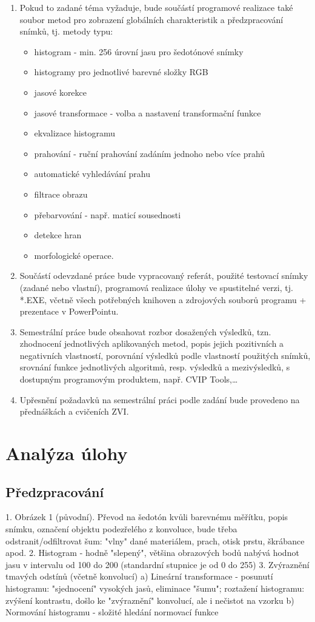 \documentclass[12pt, a4paper]{report}
\begin{document}
\begin{enumerate}
	\item Pokud to zadané téma vyžaduje, bude součástí programové realizace také soubor metod pro
zobrazení globálních charakteristik a předzpracování snímků, tj. metody typu:
	\begin{itemize}
		\item histogram - min. 256 úrovní jasu pro šedotónové snímky
		\item histogramy pro jednotlivé barevné složky RGB
		\item jasové korekce
		\item jasové transformace - volba a nastavení transformační funkce
		\item ekvalizace histogramu
		\item prahování - ruční prahování zadáním jednoho nebo více prahů
		\item automatické vyhledávání prahu
		\item filtrace obrazu
		\item přebarvování - např. maticí sousednosti
		\item detekce hran
		\item morfologické operace.
	\end{itemize}		
\item{Součástí odevzdané práce bude vypracovaný referát, použité testovací snímky (zadané nebo
vlastní), programová realizace úlohy ve spustitelné verzi, tj. *.EXE, včetně všech potřebných
knihoven a zdrojových souborů programu + prezentace v PowerPointu.}
\item{Semestrální práce bude obsahovat rozbor dosažených výsledků, tzn. zhodnocení jednotlivých
aplikovaných metod, popis jejich pozitivních a negativních vlastností, porovnání výsledků podle
vlastností použitých snímků, srovnání funkce jednotlivých algoritmů, resp. výsledků
a mezivýsledků, s dostupným programovým produktem, např. CVIP Tools,…}
\item{Upřesnění požadavků na semestrální práci podle zadání bude provedeno na přednáškách
a cvičeních ZVI.}
\end{enumerate}
\chapter{Analýza úlohy}
	\section{Předzpracování}
	1. Obrázek 1 (původní). Převod na šedotón kvůli barevnému měřítku, popis snímku, označení objektu podezřelého z konvoluce, bude třeba odstranit/odfiltrovat šum: "vlny" dané materiálem, prach, otisk prstu, škrábance apod.
	2. Histogram - hodně "slepený", většina obrazových bodů nabývá hodnot jasu v intervalu od 100 do 200 (standardní stupnice je od 0 do 255)
	3.	Zvýraznění tmavých odstínů (včetně konvolucí) 
		a) Lineární transformace - posunutí histogramu: "sjednocení" vysokých jasů, eliminace "šumu"; roztažení histogramu: zvýšení kontrastu, došlo ke "zvýraznění" konvolucí, ale i nečistot na vzorku 
		b) Normování histogramu - složité hledání normovací funkce
\end{document}
